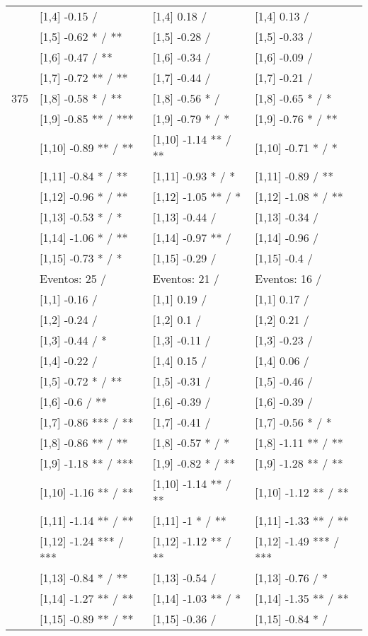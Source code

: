 \begin{table}
\begin{tabular}[t]{llll}
\addlinespace
 & {}[1,4] -0.15  / & {}[1,4] 0.18  / & {}[1,4] 0.13  /\\
 & {}[1,5] -0.62 * / ** & {}[1,5] -0.28  / & {}[1,5] -0.33  /\\
 & {}[1,6] -0.47  / ** & {}[1,6] -0.34  / & {}[1,6] -0.09  /\\
 & {}[1,7] -0.72 ** / ** & {}[1,7] -0.44  / & {}[1,7] -0.21  /\\
375 & {}[1,8] -0.58 * / ** & {}[1,8] -0.56 * / & {}[1,8] -0.65 * / *\\
\addlinespace
 & {}[1,9] -0.85 ** / *** & {}[1,9] -0.79 * / * & {}[1,9] -0.76 * / **\\
 & {}[1,10] -0.89 ** / ** & {}[1,10] -1.14 ** / ** & {}[1,10] -0.71 * / *\\
 & {}[1,11] -0.84 * / ** & {}[1,11] -0.93 * / * & {}[1,11] -0.89  / **\\
 & {}[1,12] -0.96 * / ** & {}[1,12] -1.05 ** / * & {}[1,12] -1.08 * / **\\
 & {}[1,13] -0.53 * / * & {}[1,13] -0.44  / & {}[1,13] -0.34  /\\
\addlinespace
 & {}[1,14] -1.06 * / ** & {}[1,14] -0.97 ** / & {}[1,14] -0.96  /\\
 & {}[1,15] -0.73 * / * & {}[1,15] -0.29  / & {}[1,15] -0.4  /\\
 & Eventos:  25 / & Eventos:  21 / & Eventos:  16 /\\
 & {}[1,1] -0.16  / & {}[1,1] 0.19  / & {}[1,1] 0.17  /\\
 & {}[1,2] -0.24  / & {}[1,2] 0.1  / & {}[1,2] 0.21  /\\
\addlinespace
 & {}[1,3] -0.44  / * & {}[1,3] -0.11  / & {}[1,3] -0.23  /\\
 & {}[1,4] -0.22  / & {}[1,4] 0.15  / & {}[1,4] 0.06  /\\
 & {}[1,5] -0.72 * / ** & {}[1,5] -0.31  / & {}[1,5] -0.46  /\\
 & {}[1,6] -0.6  / ** & {}[1,6] -0.39  / & {}[1,6] -0.39  /\\
 & {}[1,7] -0.86 *** / ** & {}[1,7] -0.41  / & {}[1,7] -0.56 * / *\\
\addlinespace
500 & {}[1,8] -0.86 ** / ** & {}[1,8] -0.57 * / * & {}[1,8] -1.11 ** / **\\
 & {}[1,9] -1.18 ** / *** & {}[1,9] -0.82 * / ** & {}[1,9] -1.28 ** / **\\
 & {}[1,10] -1.16 ** / ** & {}[1,10] -1.14 ** / ** & {}[1,10] -1.12 ** / **\\
 & {}[1,11] -1.14 ** / ** & {}[1,11] -1 * / ** & {}[1,11] -1.33 ** / **\\
 & {}[1,12] -1.24 *** / *** & {}[1,12] -1.12 ** / ** & {}[1,12] -1.49 *** / ***\\
\addlinespace
 & {}[1,13] -0.84 * / ** & {}[1,13] -0.54  / & {}[1,13] -0.76  / *\\
 & {}[1,14] -1.27 ** / ** & {}[1,14] -1.03 ** / * & {}[1,14] -1.35 ** / **\\
 & {}[1,15] -0.89 ** / ** & {}[1,15] -0.36  / & {}[1,15] -0.84 * /\\
\bottomrule
\end{tabular}
\end{table}
